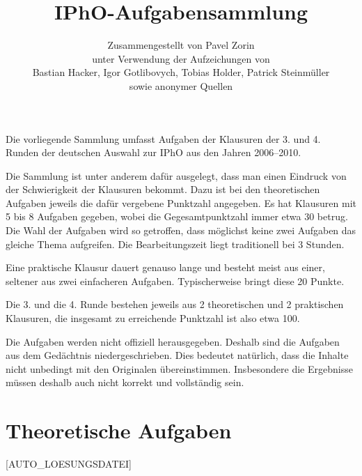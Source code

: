 \title{IPhO-Aufgabensammlung}
\author{Zusammengestellt von Pavel Zorin\\
unter Verwendung der Aufzeichungen von\\
Bastian Hacker, Igor Gotlibovych, Tobias Holder, Patrick Steinmüller\\
sowie anonymer Quellen}


\maketitle

Die vorliegende Sammlung umfasst Aufgaben der Klausuren der 3. und 4. Runden der deutschen Auswahl zur IPhO aus den Jahren 2006--2010.

Die Sammlung ist unter anderem dafür ausgelegt, dass man einen Eindruck von der Schwierigkeit der Klausuren bekommt. Dazu ist bei den theoretischen Aufgaben jeweils die dafür vergebene Punktzahl angegeben. Es hat Klausuren mit 5 bis 8 Aufgaben gegeben, wobei die Gegesamtpunktzahl immer etwa 30 betrug. Die Wahl der Aufgaben wird so getroffen, dass möglichst keine zwei Aufgaben das gleiche Thema aufgreifen. Die Bearbeitungszeit liegt traditionell bei 3 Stunden.

Eine praktische Klausur dauert genauso lange und besteht meist aus einer, seltener aus zwei einfacheren Aufgaben. Typischerweise bringt diese 20 Punkte.

Die 3. und die 4. Runde bestehen jeweils aus 2 theoretischen und 2 praktischen Klausuren, die insgesamt zu erreichende Punktzahl ist also etwa 100.

Die Aufgaben werden nicht offiziell herausgegeben. Deshalb sind die Aufgaben aus dem Gedächtnis niedergeschrieben. Dies bedeutet natürlich, dass die Inhalte nicht unbedingt mit den Originalen übereinstimmen. Insbesondere die Ergebnisse müssen deshalb auch nicht korrekt und vollständig sein.

\section*{Theoretische Aufgaben}

[AUTO_LOESUNGSDATEI]






















